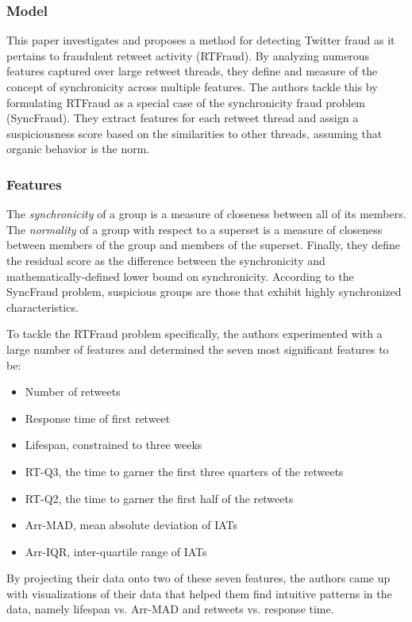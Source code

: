 \documentclass[11pt, oneside]{article}   	%
\begin{document}
\subsubsection*{Model}

\quad This paper investigates and proposes a method for detecting Twitter fraud as it pertains to fraudulent retweet activity (RTFraud).
By analyzing numerous features captured over large retweet threads, they define and measure of the concept of synchronicity across multiple features.
The authors tackle this by formulating RTFraud as a special case of the synchronicity fraud problem (SyncFraud).
They extract features for each retweet thread and assign a suspiciousness score based on the similarities to other threads, assuming that organic behavior is the norm.

\subsubsection*{Features}

\quad The \textit{synchronicity} of a group is a measure of closeness between all of its members.
The \textit{normality} of a group with respect to a superset is a measure of closeness between members of the group and members of the superset.
Finally, they define the residual score as the difference between the synchronicity and mathematically-defined lower bound on synchronicity.
According to the SyncFraud problem, suspicious groups are those that exhibit highly synchronized characteristics.

\quad To tackle the RTFraud problem specifically, the authors experimented with a large number of features and determined the seven most significant features to be:
\begin{itemize}
	\item Number of retweets
	\item Response time of first retweet
	\item Lifespan, constrained to three weeks
	\item RT-Q3, the time to garner the first three quarters of the retweets
	\item RT-Q2, the time to garner the first half of the retweets
	\item Arr-MAD, mean absolute deviation of IATs
	\item Arr-IQR, inter-quartile range of IATs
\end{itemize}

\quad By projecting their data onto two of these seven features, the authors came up with visualizations of their data that helped them find intuitive patterns in the data, namely lifespan vs. Arr-MAD and retweets vs. response time.
\end{document}
